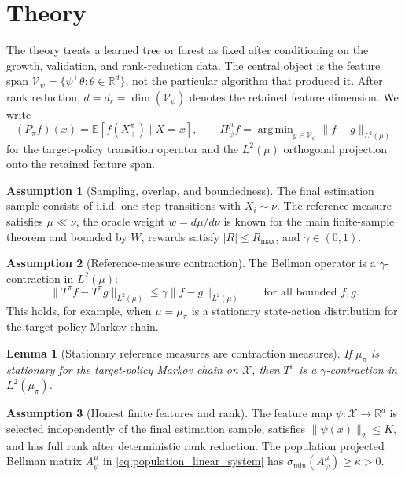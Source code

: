\documentclass{article}
\DeclareMathOperator*{\argmin}{arg\,min}
\newcommand{\E}{\mathbb{E}}
\newcommand{\R}{\mathbb{R}}
\newcommand{\cX}{\mathcal X}
\newcommand{\cV}{\mathcal V}
\newcommand{\proj}{\Pi}
\theoremstyle{plain}
\newtheorem{lemma}{Lemma}
\theoremstyle{definition}
\newtheorem{assumption}{Assumption}
\theoremstyle{remark}
\begin{document}
\section{Theory}
\label{sec:theory}

The theory treats a learned tree or forest as fixed after conditioning on the
growth, validation, and rank-reduction data. The central object is the feature span
\(\cV_\psi=\{\psi^\top\theta:\theta\in\R^d\}\), not the particular algorithm
that produced it.
After rank reduction, \(d=d_r=\dim(\cV_\psi)\) denotes the retained feature
dimension. We write
\[
  (P_\pi f)(x)=\E[f(X^\pi_+)\mid X=x],
  \qquad
  \proj^\mu_\psi f
  =
  \argmin_{g\in\cV_\psi}\|f-g\|_{L^2(\mu)}
\]
for the target-policy transition operator and the \(L^2(\mu)\) orthogonal
projection onto the retained feature span.

\begin{assumption}[Sampling, overlap, and boundedness]
\label{ass:coverage}
The final estimation sample consists of i.i.d. one-step transitions with
\(X_i\sim\nu\). The reference measure satisfies \(\mu\ll\nu\), the oracle
weight \(w=d\mu/d\nu\) is known for the main finite-sample theorem and bounded
by \(W\), rewards satisfy \(|R|\le R_{\max}\), and \(\gamma\in(0,1)\).
\end{assumption}

\begin{assumption}[Reference-measure contraction]
\label{ass:l2contract}
The Bellman operator is a \(\gamma\)-contraction in \(L^2(\mu)\):
\[
  \|T^\pi f-T^\pi g\|_{L^2(\mu)}
  \le
  \gamma\|f-g\|_{L^2(\mu)}
  \qquad\text{for all bounded } f,g .
\]
This holds, for example, when \(\mu=\mu_\pi\) is a stationary state-action
distribution for the target-policy Markov chain.
\end{assumption}

\begin{lemma}[Stationary reference measures are contraction measures]
\label{lem:stationary_contraction}
If \(\mu_\pi\) is stationary for the target-policy Markov chain on
\(\cX\), then \(T^\pi\) is a \(\gamma\)-contraction in \(L^2(\mu_\pi)\).
\end{lemma}

\begin{assumption}[Honest finite features and rank]
\label{ass:rank}
The feature map \(\psi:\cX\to\R^d\) is selected independently of the final
estimation sample, satisfies \(\|\psi(x)\|_2\le K\), and has full rank after
deterministic rank reduction. The population projected Bellman matrix
\(A^\mu_\psi\) in \eqref{eq:population_linear_system} has
\(\sigma_{\min}(A^\mu_\psi)\ge \kappa>0\).
\end{assumption}
\end{document}

